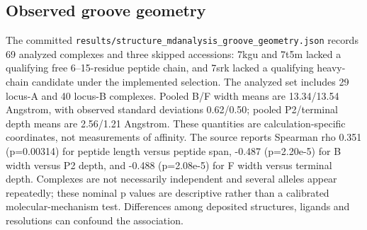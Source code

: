 \subsection{Observed groove geometry}
The committed \texttt{results/structure\_mdanalysis\_groove\_geometry.json} records 69 analyzed complexes and three skipped accessions: 7kgu and 7t5m lacked a qualifying free 6--15-residue peptide chain, and 7srk lacked a qualifying heavy-chain candidate under the implemented selection. The analyzed set includes 29 locus-A and 40 locus-B complexes. Pooled B/F width means are 13.34/13.54 Angstrom, with observed standard deviations 0.62/0.50; pooled P2/terminal depth means are 2.56/1.21 Angstrom. These quantities are calculation-specific coordinates, not measurements of affinity.
The source reports Spearman rho 0.351 (p=0.00314) for peptide length versus peptide span, -0.487 (p=2.20e-5) for B width versus P2 depth, and -0.488 (p=2.08e-5) for F width versus terminal depth. Complexes are not necessarily independent and several alleles appear repeatedly; these nominal p values are descriptive rather than a calibrated molecular-mechanism test. Differences among deposited structures, ligands and resolutions can confound the association.
